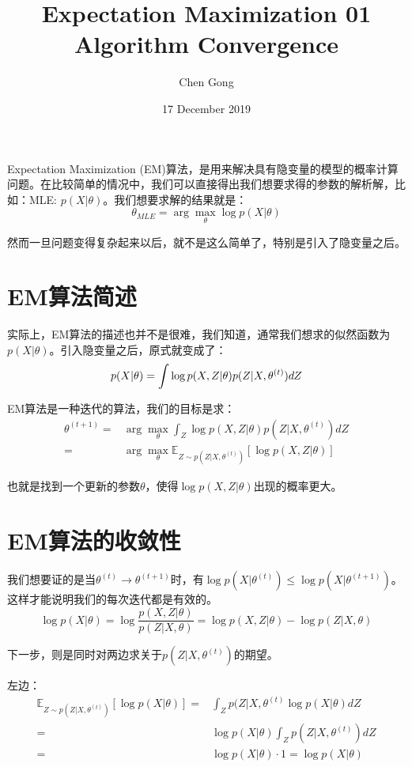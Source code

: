 \documentclass[a4paper]{article}
\title{Expectation Maximization 01 Algorithm Convergence}
\author{Chen Gong}
\date{17 December 2019}
\begin{document}
\maketitle
Expectation Maximization (EM)算法，是用来解决具有隐变量的模型的概率计算问题。在比较简单的情况中，我们可以直接得出我们想要求得的参数的解析解，比如：MLE: $p(X|\theta)$。我们想要求解的结果就是：
\begin{equation}
    \theta_{MLE} = \arg\max_{\theta}\log p(X|\theta)
\end{equation}

然而一旦问题变得复杂起来以后，就不是这么简单了，特别是引入了隐变量之后。

\section{EM算法简述}
实际上，EM算法的描述也并不是很难，我们知道，通常我们想求的似然函数为$p(X|\theta)$。引入隐变量之后，原式就变成了：
\begin{equation}
    p(X|\theta) = \int \log p(X,Z|\theta)p(Z|X,\theta^{(t)})dZ \\
\end{equation}

EM算法是一种迭代的算法，我们的目标是求：
\begin{equation}
    \begin{split}
        \theta^{(t+1)} = &\arg\max_{\theta} \int_Z
        \log p(X,Z|\theta)p(Z|X,\theta^{(t)})dZ \\
        = &\arg\max_{\theta} \mathbb{E}_{Z \sim p(Z|X,\theta^{(t)})}[\log p(X,Z|\theta)]
    \end{split}
\end{equation}

也就是找到一个更新的参数$\theta$，使得$\log p(X,Z|\theta)$出现的概率更大。

\section{EM算法的收敛性}
我们想要证的是当$\theta^{(t)} \longrightarrow \theta^{(t+1)}$时，有$\log p(X|\theta^{(t)}) \leq \log p(X|\theta^{(t+1)})$。这样才能说明我们的每次迭代都是有效的。
\begin{equation}
    \log p(X|\theta) = \log \frac{p(X,Z|\theta)}{ p(Z|X,\theta)} = \log p(X,Z|\theta) - \log p(Z|X,\theta)
\end{equation}

下一步，则是同时对两边求关于$p(Z|X,\theta^{(t)})$的期望。

左边：
\begin{equation}
    \begin{split}
        \mathbb{E}_{Z\sim p(Z|X,\theta^{(t)})}[\log p(X|\theta)] 
        = & \int_Z p(Z|X,\theta^{(t)}\log p(X|\theta) dZ \\
        = & \log p(X|\theta) \int_Z p(Z|X,\theta^{(t)}) dZ \\
        = & \log p(X|\theta) \cdot 1 = \log p(X|\theta)
    \end{split}
\end{equation}
\end{document}
